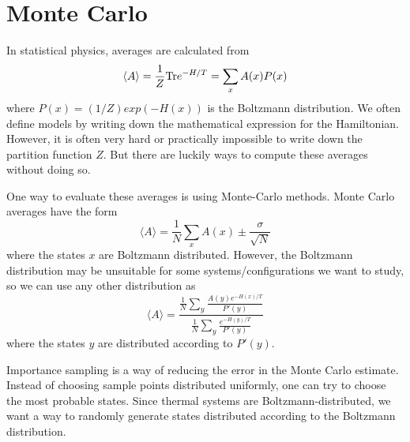 %

\section{Monte Carlo}
In statistical physics, averages are calculated from 
\begin{equation}
  \langle A\rangle = \frac{1}{Z}\textrm{Tr} e^{-H/T} = \sum_x A(x) P(x)
\end{equation}
where  $P(x) = (1/Z)exp(-H(x))$ is the Boltzmann distribution.
We often define models by writing down the mathematical expression for the Hamiltonian. However, it is often very hard or practically impossible to write down the partition function $Z$. But there are luckily ways to compute these averages without doing so.

One way to evaluate these averages is using Monte-Carlo methods. 
Monte Carlo averages have the form 
\begin{equation}
  \langle A \rangle = \frac{1}{N} \sum_x A(x) \pm \frac{\sigma	}{\sqrt N}
\end{equation}
where the states $x$ are Boltzmann distributed.
However, the Boltzmann distribution may be unsuitable for some systems/configurations we want to study, so we can use any other distribution as 
\begin{equation}
  \langle A \rangle = \frac{\frac{1}{N}\sum_y \frac{A(y) e^{-H(x)/T}}{P'(y)}}{\frac{1}{N}\sum_y \frac{e^{-H(y)/T}}{P'(y)}}  
\end{equation}
 where the states $y$ are distributed according to $P'(y)$.

 Importance sampling is a way of reducing the error in the Monte Carlo estimate. Instead of choosing sample points distributed uniformly, one can try to choose the most probable states. Since thermal systems are Boltzmann-distributed, we want a way to randomly generate states distributed according to the Boltzmann distribution.


